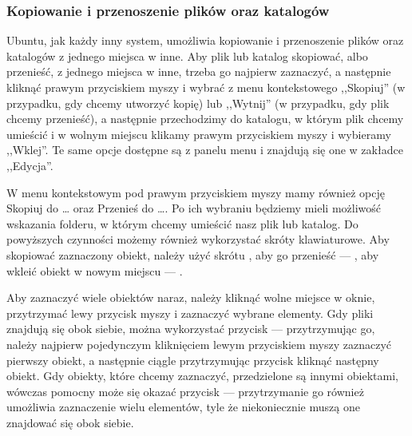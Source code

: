 \subsubsection{Kopiowanie i przenoszenie plików oraz katalogów}
Ubuntu, jak każdy inny system, umożliwia kopiowanie i przenoszenie plików oraz katalogów z jednego miejsca w inne. Aby plik lub katalog skopiować, albo przenieść, z jednego miejsca w inne, trzeba go najpierw zaznaczyć, a następnie kliknąć prawym przyciskiem myszy i wybrać z menu kontekstowego ,,Skopiuj'' (w przypadku, gdy chcemy utworzyć kopię) lub ,,Wytnij'' (w przypadku, gdy plik chcemy przenieść), a następnie przechodzimy do katalogu, w którym plik chcemy umieścić i w wolnym miejscu klikamy prawym przyciskiem myszy i wybieramy ,,Wklej''. Te same opcje dostępne są z panelu menu i znajdują się one w zakładce ,,Edycja''.

W menu kontekstowym pod prawym przyciskiem myszy mamy również opcję \textcolor{ubuntu_orange}{Skopiuj do \ldots} oraz \textcolor{ubuntu_orange}{Przenieś do \ldots}. Po ich wybraniu będziemy mieli możliwość wskazania folderu, w którym chcemy umieścić nasz plik lub katalog.
Do powyższych czynności możemy również wykorzystać skróty klawiaturowe. Aby skopiować zaznaczony obiekt, należy użyć skrótu , aby go przenieść --- , aby wkleić obiekt w nowym miejscu --- .

Aby zaznaczyć wiele obiektów naraz, należy kliknąć wolne miejsce w oknie, przytrzymać lewy przycisk myszy i zaznaczyć wybrane elementy. Gdy pliki znajdują się obok siebie, można wykorzystać przycisk  --- przytrzymując go, należy najpierw pojedynczym kliknięciem lewym przyciskiem myszy zaznaczyć pierwszy obiekt, a następnie ciągle przytrzymując przycisk  kliknąć następny obiekt. Gdy obiekty, które chcemy zaznaczyć, przedzielone są innymi obiektami, wówczas pomocny może się okazać przycisk  --- przytrzymanie go również umożliwia zaznaczenie wielu elementów, tyle że niekoniecznie muszą one znajdować się obok siebie.

